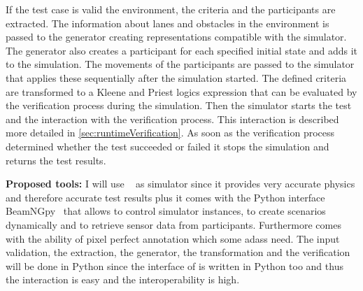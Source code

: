 If the test case is valid the environment, the criteria and the participants are extracted.
The information about lanes and obstacles in the environment is passed to the generator creating representations compatible with the simulator.
The generator also creates a participant for each specified initial state and adds it to the simulation.
The movements of the participants are passed to the simulator that applies these sequentially after the simulation started.
The defined criteria are transformed to a Kleene and Priest logics expression that can be evaluated by the verification process during the simulation.
Then the simulator starts the test and the interaction with the verification process.
This interaction is described more detailed in \autoref{sec:runtimeVerification}.
As soon as the verification process determined whether the test succeeded or failed it stops the simulation and returns the test results.

{\bfseries Proposed tools:} I will use \beamng{}~\cite{beamNG} as simulator since it provides very accurate physics and therefore accurate test results plus it comes with the Python interface BeamNGpy~\cite{beamngpy} that allows to control simulator instances, to create scenarios dynamically and to retrieve sensor data from participants.
Furthermore \beamng{} comes with the ability of pixel perfect annotation which some \glspl{adas} need.
The input validation, the extraction, the generator, the transformation and the verification will be done in Python since the interface of \beamng{} is written in Python too and thus the interaction is easy and the interoperability is high.

